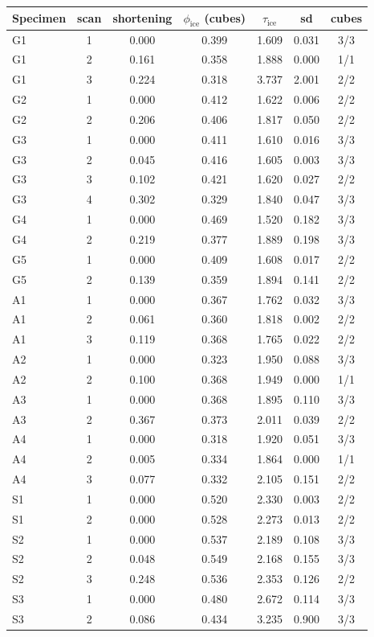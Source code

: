 \begin{tabular}{lcccccc}
\toprule
Specimen & scan & shortening & $\phi_\mathrm{ice}$ (cubes) & $\tau_\mathrm{ice}$ & sd & cubes \\
\midrule
G1 & 1 & 0.000 & 0.399 & 1.609 & 0.031 & 3/3 \\
G1 & 2 & 0.161 & 0.358 & 1.888 & 0.000 & 1/1 \\
G1 & 3 & 0.224 & 0.318 & 3.737 & 2.001 & 2/2 \\
G2 & 1 & 0.000 & 0.412 & 1.622 & 0.006 & 2/2 \\
G2 & 2 & 0.206 & 0.406 & 1.817 & 0.050 & 2/2 \\
G3 & 1 & 0.000 & 0.411 & 1.610 & 0.016 & 3/3 \\
G3 & 2 & 0.045 & 0.416 & 1.605 & 0.003 & 3/3 \\
G3 & 3 & 0.102 & 0.421 & 1.620 & 0.027 & 2/2 \\
G3 & 4 & 0.302 & 0.329 & 1.840 & 0.047 & 3/3 \\
G4 & 1 & 0.000 & 0.469 & 1.520 & 0.182 & 3/3 \\
G4 & 2 & 0.219 & 0.377 & 1.889 & 0.198 & 3/3 \\
G5 & 1 & 0.000 & 0.409 & 1.608 & 0.017 & 2/2 \\
G5 & 2 & 0.139 & 0.359 & 1.894 & 0.141 & 2/2 \\
A1 & 1 & 0.000 & 0.367 & 1.762 & 0.032 & 3/3 \\
A1 & 2 & 0.061 & 0.360 & 1.818 & 0.002 & 2/2 \\
A1 & 3 & 0.119 & 0.368 & 1.765 & 0.022 & 2/2 \\
A2 & 1 & 0.000 & 0.323 & 1.950 & 0.088 & 3/3 \\
A2 & 2 & 0.100 & 0.368 & 1.949 & 0.000 & 1/1 \\
A3 & 1 & 0.000 & 0.368 & 1.895 & 0.110 & 3/3 \\
A3 & 2 & 0.367 & 0.373 & 2.011 & 0.039 & 2/2 \\
A4 & 1 & 0.000 & 0.318 & 1.920 & 0.051 & 3/3 \\
A4 & 2 & 0.005 & 0.334 & 1.864 & 0.000 & 1/1 \\
A4 & 3 & 0.077 & 0.332 & 2.105 & 0.151 & 2/2 \\
S1 & 1 & 0.000 & 0.520 & 2.330 & 0.003 & 2/2 \\
S1 & 2 & 0.000 & 0.528 & 2.273 & 0.013 & 2/2 \\
S2 & 1 & 0.000 & 0.537 & 2.189 & 0.108 & 3/3 \\
S2 & 2 & 0.048 & 0.549 & 2.168 & 0.155 & 3/3 \\
S2 & 3 & 0.248 & 0.536 & 2.353 & 0.126 & 2/2 \\
S3 & 1 & 0.000 & 0.480 & 2.672 & 0.114 & 3/3 \\
S3 & 2 & 0.086 & 0.434 & 3.235 & 0.900 & 3/3 \\
\bottomrule
\end{tabular}

